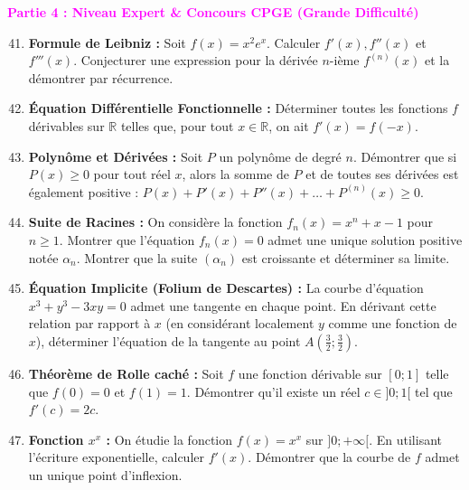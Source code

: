 \documentclass[10pt, a4paper]{article}
\begin{document}
\vspace{0.5cm}
\Large
\textbf{\textcolor{magenta}{Partie 4 : Niveau Expert \& Concours CPGE (Grande Difficulté)}}
\normalsize
\vspace{0.2cm}

\begin{center}
\end{center}

\begin{enumerate}
    \setcounter{enumi}{40}
    \item \textbf{Formule de Leibniz :} Soit $f(x) = x^2 e^x$. Calculer $f'(x), f''(x)$ et $f'''(x)$. Conjecturer une expression pour la dérivée $n$-ième $f^{(n)}(x)$ et la démontrer par récurrence.
    \item \textbf{Équation Différentielle Fonctionnelle :} Déterminer toutes les fonctions $f$ dérivables sur $\mathbb{R}$ telles que, pour tout $x \in \mathbb{R}$, on ait $f'(x) = f(-x)$.
    \item \textbf{Polynôme et Dérivées :} Soit $P$ un polynôme de degré $n$. Démontrer que si $P(x) \ge 0$ pour tout réel $x$, alors la somme de $P$ et de toutes ses dérivées est également positive : $P(x) + P'(x) + P''(x) + \dots + P^{(n)}(x) \ge 0$.
    \item \textbf{Suite de Racines :} On considère la fonction $f_n(x) = x^n + x - 1$ pour $n \ge 1$. Montrer que l'équation $f_n(x) = 0$ admet une unique solution positive notée $\alpha_n$. Montrer que la suite $(\alpha_n)$ est croissante et déterminer sa limite.
    \item \textbf{Équation Implicite (Folium de Descartes) :} La courbe d'équation $x^3 + y^3 - 3xy = 0$ admet une tangente en chaque point. En dérivant cette relation par rapport à $x$ (en considérant localement $y$ comme une fonction de $x$), déterminer l'équation de la tangente au point $A(\frac{3}{2} ; \frac{3}{2})$.
    \item \textbf{Théorème de Rolle caché :} Soit $f$ une fonction dérivable sur $[0 ; 1]$ telle que $f(0) = 0$ et $f(1) = 1$. Démontrer qu'il existe un réel $c \in ]0 ; 1[$ tel que $f'(c) = 2c$.
    \item \textbf{Fonction $x^x$ :} On étudie la fonction $f(x) = x^x$ sur $]0 ; +\infty[$. En utilisant l'écriture exponentielle, calculer $f'(x)$. Démontrer que la courbe de $f$ admet un unique point d'inflexion.

\end{enumerate}
\end{document}
